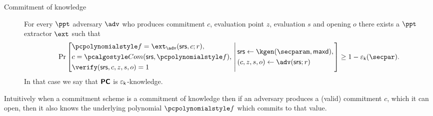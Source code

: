 \documentclass[runningheads,11pt]{llncs}
\begin{document}
\begin{description}
\item[Commitment of knowledge]  For every $\ppt$ adversary $\adv$ who produces
  commitment $c$, evaluation point $z$, evaluation $s$ and opening $o$ there
  exists a $\ppt$ extractor $\ext$ such that
\[
  \Pr \left[
    \begin{aligned}
      & \p{f} = \ext_\adv(\srs, c; r),\\
      & c = \com(\srs, \p{f}),\\
      & \verify(\srs, c, z, s, o) = 1
    \end{aligned}
    \,\left|\,
      \vphantom{
        \begin{aligned}
          & \\
          & \\
          &
        \end{aligned}
        }
    \begin{aligned}
      & \srs \gets \kgen(\secparam, \maxdeg),\\
      & (c, z, s, o) \gets \adv(\srs; r)
    \end{aligned}
  \right.\right]
  \geq 1 - \epsk(\secpar).
\]
In that case we say that $\bm{\mathsf{PC}}$ is $\varepsilon_{\mathsf{k}}$-knowledge.
\end{description}
Intuitively when a commitment scheme is a commitment of knowledge then if an
adversary produces a (valid) commitment $c$, which it can open, then it also
knows the underlying polynomial $\p{f}$ which commits to that value.
\end{document}
